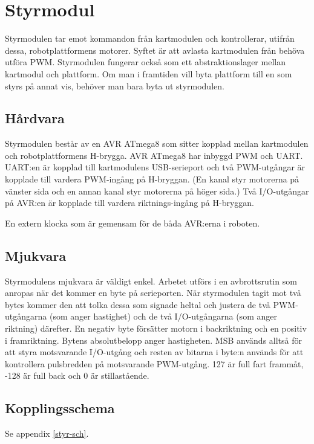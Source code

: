 \section{Styrmodul}

Styrmodulen tar emot kommandon från kartmodulen och kontrollerar, utifrån
dessa, robotplattformens motorer. Syftet är att avlasta kartmodulen från behöva
utföra PWM. Styrmodulen fungerar också som ett abstraktionslager mellan
kartmodul och plattform. Om man i framtiden vill byta plattform till en som
styrs på annat vis, behöver man bara byta ut styrmodulen.

\subsection{Hårdvara}

Styrmodulen består av en AVR ATmega8 som sitter kopplad mellan kartmodulen och
robotplattformens H-brygga. AVR ATmega8 har inbyggd PWM och UART. UART:en är
kopplad till kartmodulens USB-serieport och två PWM-utgångar är kopplade till
vardera PWM-ingång på H-bryggan. (En kanal styr motorerna på vänster sida och
en annan kanal styr motorerna på höger sida.) Två I/O-utgångar på AVR:en är
kopplade till vardera riktnings-ingång på H-bryggan.

En extern klocka som är gemensam för de båda AVR:erna i roboten.

\subsection{Mjukvara}

Styrmodulens mjukvara är väldigt enkel. Arbetet utförs i en avbrottsrutin som
anropas när det kommer en byte på serieporten. När styrmodulen tagit mot två
bytes kommer den att tolka dessa som signade heltal och justera de två
PWM-utgångarna (som anger hastighet) och de två I/O-utgångarna (som anger
riktning) därefter. En negativ byte försätter motorn i backriktning och en
positiv i framriktning. Bytens absolutbelopp anger hastigheten. MSB används
alltså för att styra motsvarande I/O-utgång och resten av bitarna i byte:n
används för att kontrollera pulsbredden på motsvarande PWM-utgång. 127 är full
fart frammåt, -128 är full back och 0 är stillastående.

\subsection{Kopplingsschema}
Se appendix \ref{styr-sch}.
